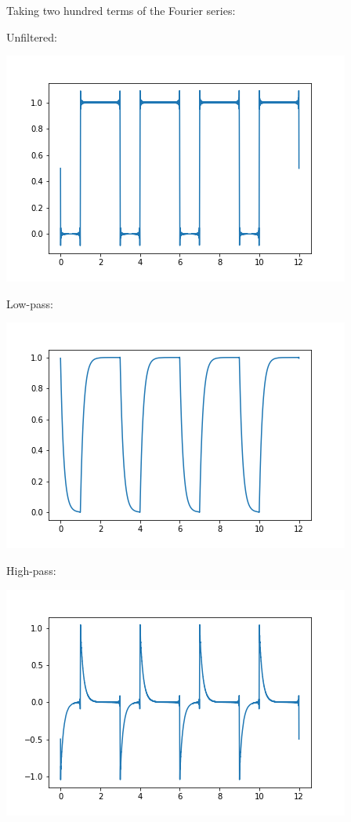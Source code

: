 \documentclass{article}
\begin{document}
\clearpage

Taking two hundred terms of the Fourier series:

Unfiltered:

\includegraphics[scale=0.7]{Unfiltered200.png}

Low-pass:

\includegraphics[scale=0.7]{LowPass200.png}

High-pass:

\includegraphics[scale=0.7]{HighPass200.png}
\end{document}
